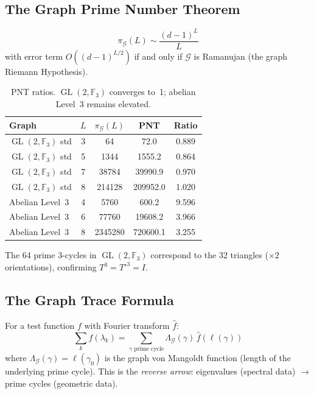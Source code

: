 \documentclass[12pt,reqno]{amsart}
\theoremstyle{plain}
\theoremstyle{definition}
\theoremstyle{remark}
\DeclareMathOperator{\GL}{GL}
\newcommand{\FF}{\mathbb{F}}
\begin{document}
\subsection{The Graph Prime Number Theorem}

\begin{equation}\label{eq:graph_pnt}
  \pi_\mathcal{G}(L) \sim \frac{(d-1)^L}{L}
\end{equation}
with error term $O((d-1)^{L/2})$ if and only if $\mathcal{G}$ is
Ramanujan (the graph Riemann Hypothesis).

\begin{table}[h]
\centering
\begin{tabular}{lcccc}
  \toprule
  Graph & $L$ & $\pi_\mathcal{G}(L)$ & PNT & Ratio \\
  \midrule
  $\GL(2,\FF_3)$ std & 3 & 64    & 72.0    & 0.889 \\
  $\GL(2,\FF_3)$ std & 5 & 1344  & 1555.2  & 0.864 \\
  $\GL(2,\FF_3)$ std & 7 & 38784 & 39990.9 & 0.970 \\
  $\GL(2,\FF_3)$ std & 8 & 214128 & 209952.0 & 1.020 \\
  \midrule
  Abelian Level~3    & 4 & 5760  & 600.2   & 9.596 \\
  Abelian Level~3    & 6 & 77760 & 19608.2 & 3.966 \\
  Abelian Level~3    & 8 & 2345280 & 720600.1 & 3.255 \\
  \bottomrule
\end{tabular}
\caption{PNT ratios.  $\GL(2,\FF_3)$ converges to~1; abelian Level~3
  remains elevated.}
\label{tab:pnt}
\end{table}

The 64 prime 3-cycles in $\GL(2,\FF_3)$ correspond to the 32
triangles ($\times 2$ orientations), confirming $T^3 = T'^3 = I$.

\subsection{The Graph Trace Formula}

For a test function $f$ with Fourier transform $\hat{f}$:
\begin{equation}\label{eq:graph_trace}
  \sum_{k} f(\lambda_k)
  = \sum_{\gamma \text{ prime cycle}} \Lambda_\mathcal{G}(\gamma)\,
    \hat{f}(\ell(\gamma))
\end{equation}
where $\Lambda_\mathcal{G}(\gamma) = \ell(\gamma_0)$ is the graph von
Mangoldt function (length of the underlying prime cycle).  This is the
\emph{reverse arrow}: eigenvalues (spectral data) $\to$ prime cycles
(geometric data).
\end{document}
